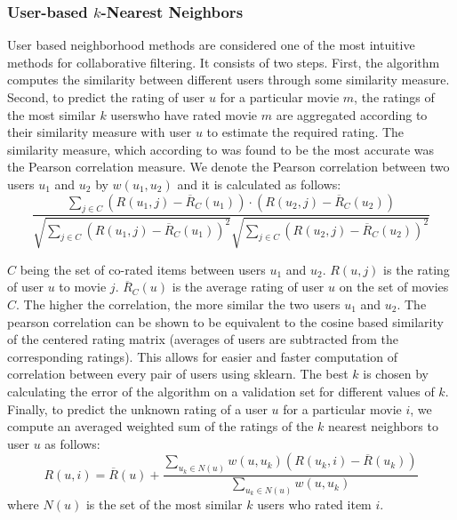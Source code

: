 \documentclass[10pt,conference,compsocconf]{IEEEtran}
\begin{document}
\subsubsection*{\textbf{User-based $k$-Nearest Neighbors}} User based neighborhood methods are considered one of the most intuitive methods for collaborative filtering. It consists of two steps. First, the algorithm computes the similarity between different users through some similarity measure. Second, to predict the rating of user $u$ for a particular movie $m$, the ratings of the most similar $k$ userswho have rated movie $m$ are aggregated according to their similarity measure with user $u$ to estimate the required rating. The similarity measure, which according to \cite{L10} was found to be the most accurate was the Pearson correlation measure. We denote the Pearson correlation between two users $u_1$ and $u_2$ by $w(u_1, u_2)$ and it is calculated as follows:
\begin{equation} \label{eqn:pearson}
\frac{\sum_{j \in C} (R(u_1, j) - \overline{R}_C(u_1))\cdot(R(u_2, j) - \overline{R}_C(u_2))}{\sqrt{\sum_{j \in C} (R(u_1, j) - \overline{R}_C(u_1))^2} \sqrt{\sum_{j \in C} (R(u_2, j) - \overline{R}_C(u_2))^2}}
\end{equation}

$C$ being the set of co-rated items between users $u_1$ and $u_2$. $R(u,j)$ is the rating of user $u$ to movie $j$. $\overline{R}_C(u)$ is the average rating of user $u$ on the set of movies $C$. The higher the correlation, the more similar the two users $u_1$ and $u_2$. The pearson correlation can be shown \cite{L10} to be equivalent to the cosine based similarity of the centered rating matrix (averages of users are subtracted from the corresponding ratings). This allows for easier and faster computation of correlation between every pair of users using sklearn. The best $k$ is chosen by calculating the error of the algorithm on a validation set for different values of $k$. Finally, to predict the unknown rating of a user $u$ for a particular movie $i$, we compute an averaged weighted sum of the ratings of the $k$ nearest neighbors to user $u$ as follows:
\begin{equation} \label{eqn:predict_user_based}
R(u,i) = \overline{R}(u) + \frac{\sum_{u_k \in N(u)} w(u,u_k)(R(u_k,i) - \overline{R}(u_k))}{\sum_{u_k \in N(u)} w(u,u_k)}
\end{equation}
where $N(u)$ is the set of the most similar $k$ users who rated item $i$.
\\
\end{document}
